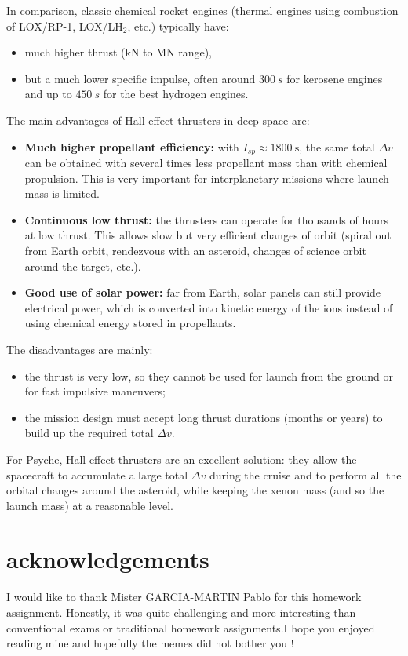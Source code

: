 \documentclass[11pt,a4paper]{article}
\begin{document}
In comparison, classic chemical rocket engines (thermal engines using combustion of LOX/RP-1, LOX/LH$_2$, etc.) typically have:
\begin{itemize}
    \item much higher thrust (kN to MN range),
    \item but a much lower specific impulse, often around $\SI{300}{s}$ for kerosene engines and up to $\SI{450}{s}$ for the best hydrogen engines.
\end{itemize}

The main advantages of Hall-effect thrusters in deep space are:
\begin{itemize}
    \item \textbf{Much higher propellant efficiency:} with $I_{sp} \approx 1800\ \text{s}$, the same total $\Delta v$ can be obtained with several times less propellant mass than with chemical propulsion. This is very important for interplanetary missions where launch mass is limited.
    \item \textbf{Continuous low thrust:} the thrusters can operate for thousands of hours at low thrust. This allows slow but very efficient changes of orbit (spiral out from Earth orbit, rendezvous with an asteroid, changes of science orbit around the target, etc.).
    \item \textbf{Good use of solar power:} far from Earth, solar panels can still provide electrical power, which is converted into kinetic energy of the ions instead of using chemical energy stored in propellants.
\end{itemize}

The disadvantages are mainly:
\begin{itemize}
    \item the thrust is very low, so they cannot be used for launch from the ground or for fast impulsive maneuvers;
    \item the mission design must accept long thrust durations (months or years) to build up the required total $\Delta v$.
\end{itemize}

For Psyche, Hall-effect thrusters are an excellent solution: they allow the spacecraft to accumulate a large total $\Delta v$ during the cruise and to perform all the orbital changes around the asteroid, while keeping the xenon mass (and so the launch mass) at a reasonable level.


\section{acknowledgements}
I would like to thank Mister GARCIA-MARTIN Pablo for this homework assignment. Honestly, it was quite challenging and more interesting than conventional exams or traditional homework assignments.I hope you enjoyed reading mine and hopefully the memes did not bother you ! 
\end{document}
